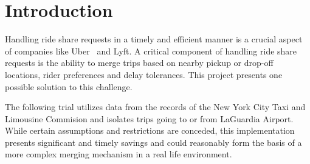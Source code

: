 \section{Introduction}
\label{sec:intro}
Handling ride share requests in a timely and efficient manner is a crucial  aspect of companies like Uber~\cite{uber} and Lyft.  
A critical component of handling ride share requests is the ability to merge trips based on nearby pickup or drop-off locations, rider preferences and delay tolerances.
This project presents one possible solution to this challenge.  

The following trial utilizes data from the records of the New York City Taxi and Limousine Commision and isolates trips going to or from LaGuardia Airport. 
While certain assumptions and restrictions are conceded, this implementation presents significant and timely savings and could reasonably form the basis of a more complex merging mechanism in a real life environment.  


